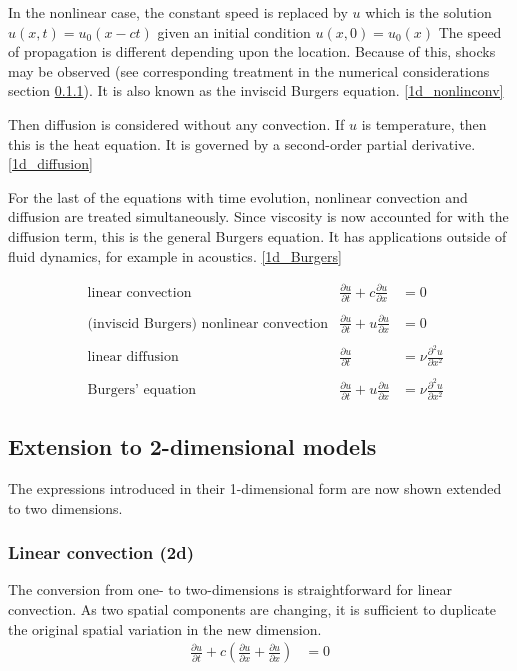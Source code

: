 \documentclass[11pt]{article}
\begin{document}
In the nonlinear case, the constant speed is replaced by $u$ which is the
solution $u(x,t)=u_0(x-ct)$ given an initial condition $u(x,0)=u_0(x)$
The speed of propagation is different depending upon the location.
Because of this, shocks may be observed (see corresponding treatment in the
numerical considerations section \ref{}). It is also known as the inviscid
Burgers equation.
\ref{1d_nonlinconv}

Then diffusion is considered without any convection.
If $u$ is temperature, then this is the heat equation.
It is governed by a second-order partial derivative. \ref{1d_diffusion}

For the last of the equations with time evolution, nonlinear convection
and diffusion are treated simultaneously. Since viscosity is now accounted
for with the diffusion term, this is the general Burgers equation. It has
applications outside of fluid dynamics, for example in acoustics.
\ref{1d_Burgers}

\begin{align}
& \text{linear convection} &
\frac{\partial u}{\partial t} + c \frac{\partial u}{\partial x} &= 0		\label{1d_linconv}
\\ \nonumber \\ & \text{(inviscid Burgers) nonlinear convection} &
\frac{\partial u}{\partial t} + u \frac{\partial u}{\partial x} &= 0		\label{1d_nonlinconv}
\\ \nonumber \\ & \text{linear diffusion} &
\frac{\partial u}{\partial t} &= \nu \frac{\partial^2 u}{\partial x^2}		\label{1d_diffusion}
\\ \nonumber \\ & \text{Burgers' equation} &
\frac{\partial u}{\partial t} + u \frac{\partial u}{\partial x} &= \nu \frac{\partial^2 u}{\partial x^2}	\label{1d_Burgers}
\end{align}

\hspace{1cm}

\subsection{Extension to 2-dimensional models}
The expressions introduced in their 1-dimensional form are now shown
extended to two dimensions.
\subsubsection{Linear convection (2d)}
The conversion from one- to two-dimensions is straightforward for linear
convection. As two spatial components are changing, it is sufficient to
duplicate the original spatial variation in the new dimension.
\begin{align}
\frac{\partial u}{\partial t} + c\left(\frac{\partial u}{\partial x}  + \frac{\partial u}{\partial x} \right)
&= 0		\label{2d_linconv}
\end{align}
\end{document}
